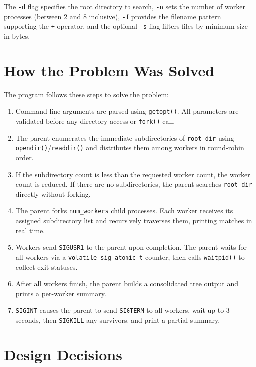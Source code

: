 \documentclass[12pt, a4paper]{article}
\begin{document}
The \texttt{-d} flag specifies the root directory to search, \texttt{-n} sets the number of worker processes (between 2 and 8 inclusive), \texttt{-f} provides the filename pattern supporting the \texttt{+} operator, and the optional \texttt{-s} flag filters files by minimum size in bytes.

\section{How the Problem Was Solved}

The program follows these steps to solve the problem:

\begin{enumerate}
    \item Command-line arguments are parsed using \texttt{getopt()}. All parameters are validated before any directory access or \texttt{fork()} call.
    \item The parent enumerates the immediate subdirectories of \texttt{root\_dir} using \texttt{opendir()}/\texttt{readdir()} and distributes them among workers in round-robin order.
    \item If the subdirectory count is less than the requested worker count, the worker count is reduced. If there are no subdirectories, the parent searches \texttt{root\_dir} directly without forking.
    \item The parent forks \texttt{num\_workers} child processes. Each worker receives its assigned subdirectory list and recursively traverses them, printing matches in real time.
    \item Workers send \texttt{SIGUSR1} to the parent upon completion. The parent waits for all workers via a \texttt{volatile sig\_atomic\_t} counter, then calls \texttt{waitpid()} to collect exit statuses.
    \item After all workers finish, the parent builds a consolidated tree output and prints a per-worker summary.
    \item \texttt{SIGINT} causes the parent to send \texttt{SIGTERM} to all workers, wait up to 3 seconds, then \texttt{SIGKILL} any survivors, and print a partial summary.
\end{enumerate}

\section{Design Decisions}
\end{document}
